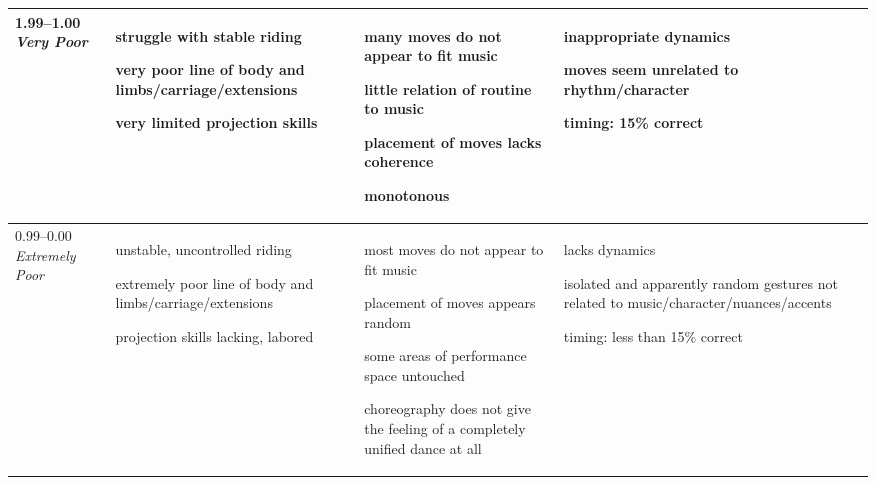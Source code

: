 \begin{longtable}{|p{1.5cm}|p{5.5cm}|p{5.5cm}|p{5.5cm}|}
1.99--1.00 \newline
\emph{Very Poor} &

\begin{judging_items}%
\item struggle with stable riding
\item very poor line of body and limbs/carriage/extensions
\item very limited projection skills 
\end{judging_items} &

\begin{judging_items}%
\item many moves do not appear to fit music
\item little relation of routine to music
\item placement of moves lacks coherence
\item monotonous 
\end{judging_items} &

\begin{judging_items}%
\item inappropriate dynamics
\item moves seem unrelated to rhythm/character
\item timing: 15\% correct
\end{judging_items} \\
\hline

0.99--0.00 \newline
\emph{Extremely Poor} &

\begin{judging_items}%
\item unstable, uncontrolled riding
\item extremely poor line of body and limbs/carriage/extensions
\item projection skills lacking, labored
\end{judging_items} &

\begin{judging_items}%
\item most moves do not appear to fit music
\item placement of moves appears random
\item some areas of performance space untouched
\item choreography does not give the feeling of a completely unified dance at all
\end{judging_items} &

\begin{judging_items}%
\item lacks dynamics
\item isolated and apparently random gestures not related to music/character/nuances/accents
\item timing: less than 15\% correct
\end{judging_items} \\
\hline

\end{longtable}
\endgroup

